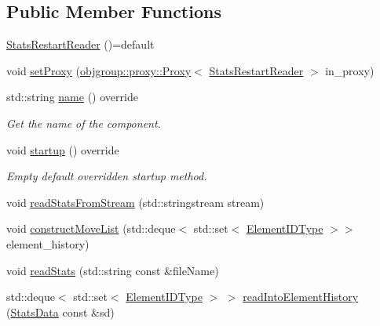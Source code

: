 \subsection*{Public Member Functions}
\begin{DoxyCompactItemize}
\item 
\hyperlink{structvt_1_1vrt_1_1collection_1_1balance_1_1_stats_restart_reader_a6813a4a484008c90cc12fb384e20f8c1}{Stats\+Restart\+Reader} ()=default
\item 
void \hyperlink{structvt_1_1vrt_1_1collection_1_1balance_1_1_stats_restart_reader_a17174042c0a87d1915ecb59315b09d52}{set\+Proxy} (\hyperlink{structvt_1_1objgroup_1_1proxy_1_1_proxy}{objgroup\+::proxy\+::\+Proxy}$<$ \hyperlink{structvt_1_1vrt_1_1collection_1_1balance_1_1_stats_restart_reader}{Stats\+Restart\+Reader} $>$ in\+\_\+proxy)
\item 
std\+::string \hyperlink{structvt_1_1vrt_1_1collection_1_1balance_1_1_stats_restart_reader_abb3373c0dd6e58b2089d9587cba71825}{name} () override
\begin{DoxyCompactList}\small\item\em Get the name of the component. \end{DoxyCompactList}\item 
void \hyperlink{structvt_1_1vrt_1_1collection_1_1balance_1_1_stats_restart_reader_a0a2bd4e4f989766216237d6aedfaaa51}{startup} () override
\begin{DoxyCompactList}\small\item\em Empty default overridden startup method. \end{DoxyCompactList}\item 
void \hyperlink{structvt_1_1vrt_1_1collection_1_1balance_1_1_stats_restart_reader_a16f224c5280bd10dc9494baad4e450e1}{read\+Stats\+From\+Stream} (std\+::stringstream stream)
\item 
void \hyperlink{structvt_1_1vrt_1_1collection_1_1balance_1_1_stats_restart_reader_a0bb3abf2d0d99caafd88c067e7c9498e}{construct\+Move\+List} (std\+::deque$<$ std\+::set$<$ \hyperlink{namespacevt_1_1vrt_1_1collection_1_1balance_a14c8d2c972f2913aa3f1636e5be0a120}{Element\+I\+D\+Type} $>$$>$ element\+\_\+history)
\item 
void \hyperlink{structvt_1_1vrt_1_1collection_1_1balance_1_1_stats_restart_reader_a8eeb8ec940e2bd7e7e41bccf2462a4d6}{read\+Stats} (std\+::string const \&file\+Name)
\item 
std\+::deque$<$ std\+::set$<$ \hyperlink{namespacevt_1_1vrt_1_1collection_1_1balance_a14c8d2c972f2913aa3f1636e5be0a120}{Element\+I\+D\+Type} $>$ $>$ \hyperlink{structvt_1_1vrt_1_1collection_1_1balance_1_1_stats_restart_reader_a95cee2dd4f9c5262fa44e102fd3b3767}{read\+Into\+Element\+History} (\hyperlink{structvt_1_1vrt_1_1collection_1_1balance_1_1_stats_data}{Stats\+Data} const \&sd)
$$
\end{DoxyCompactItemize}
